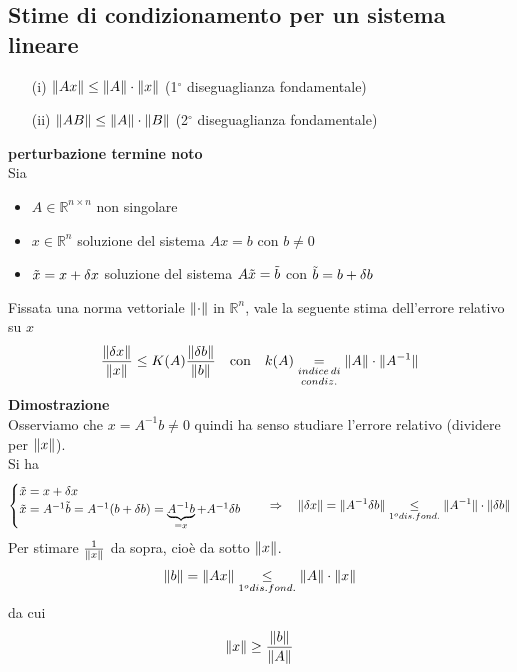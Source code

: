 \subsection{Stime di condizionamento per un sistema lineare }
\begin{itemize}
	\item[(i)]$\lVert Ax\rVert \leq \lVert A\rVert\cdot\lVert x\rVert$ (1$^\circ$ diseguaglianza fondamentale)
	\item[(ii)] $\lVert AB\rVert \leq \lVert A\rVert \cdot\lVert B\rVert$ (2$^\circ$ diseguaglianza fondamentale)
\end{itemize}
\textbf{ perturbazione termine noto}\\
Sia
\begin{itemize}
	\item  $A \in \mathbb{R}^{n\times n}$ non singolare
	\item $x \in \mathbb{R}^n$ soluzione del sistema $Ax=b$ con $b \neq 0$
	\item $\Tilde{x}=x+\delta x$ soluzione del sistema $A\Tilde{x}=\Tilde{b}$ con $\Tilde{b}=b+\delta b$
\end{itemize}
Fissata una norma vettoriale $\lVert\cdot\rVert$ in $\mathbb{R}^n$, vale la seguente stima dell'errore relativo su $x$
\begin{equation*}
\frac{\lVert\delta x\rVert}{\lVert x\rVert} \leq K(A) \frac{\lVert\delta b\rVert}{\lVert b\rVert} \quad \text{con} \quad k(A)\underset{condiz.}{\underset{indice\,di}{=}}\lVert A\rVert\cdot\lVert A^{-1}\rVert
\end{equation*}
\textbf{Dimostrazione}\\
Osserviamo che $x=A^{-1}b\neq0$ quindi ha senso studiare l'errore relativo (dividere per $\lVert x\rVert$). \\Si ha
\begin{equation*}
\begin{cases}
\tilde{x} = x + \delta x \\
\tilde{x}=A^{-1}\tilde{b}=A^{-1}(b+\delta b)=\underbrace{A^{-1}b}_{= x}+A^{-1}\delta b
\end{cases}
\quad \Rightarrow \quad \lVert\delta x\rVert=\lVert A^{-1}\delta b\rVert\underset{1^o dis. fond.}{\leq}\lVert A^{-1}\rVert\cdot\lVert\delta b\rVert
\end{equation*}
Per stimare $\frac{1}{\lVert x\rVert}$ da sopra, cioè da sotto $\lVert x\rVert$.
\begin{equation*}
\lVert b\rVert=\lVert Ax\rVert\underset{1^o dis. fond.}{\leq}\lVert A\rVert\cdot\lVert x\rVert
\end{equation*}
da cui
\begin{equation*}
\lVert x\rVert\geq\frac{\lVert b\rVert}{\lVert A\rVert}
\end{equation*}
